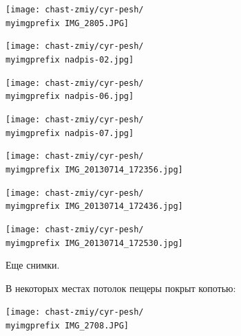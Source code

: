 \begin{center}
\texttt{[image: chast-zmiy/cyr-pesh/\\myimgprefix IMG\_2805.JPG]}
\end{center}
\vspace*{\fill}

\newpage

\vspace*{\fill}
\begin{center}
\texttt{[image: chast-zmiy/cyr-pesh/\\myimgprefix nadpis-02.jpg]}
\end{center}

\begin{center}
\texttt{[image: chast-zmiy/cyr-pesh/\\myimgprefix nadpis-06.jpg]}
\end{center}
\vspace*{\fill}

\newpage
\vspace*{\fill}
\begin{center}
\texttt{[image: chast-zmiy/cyr-pesh/\\myimgprefix nadpis-07.jpg]}
\end{center}

\begin{center}
\texttt{[image: chast-zmiy/cyr-pesh/\\myimgprefix IMG\_20130714\_172356.jpg]}
\end{center}
\vspace*{\fill}

\newpage


\vspace*{\fill}
\begin{center}
\texttt{[image: chast-zmiy/cyr-pesh/\\myimgprefix IMG\_20130714\_172436.jpg]}
\end{center}

\begin{center}
\texttt{[image: chast-zmiy/cyr-pesh/\\myimgprefix IMG\_20130714\_172530.jpg]}
\end{center}
\vspace*{\fill}

\newpage

Еще снимки.

В некоторых местах потолок пещеры покрыт копотью:
\vspace*{\fill}

\begin{center}
\texttt{[image: chast-zmiy/cyr-pesh/\\myimgprefix IMG\_2708.JPG]}
\end{center}
\vspace*{\fill}

